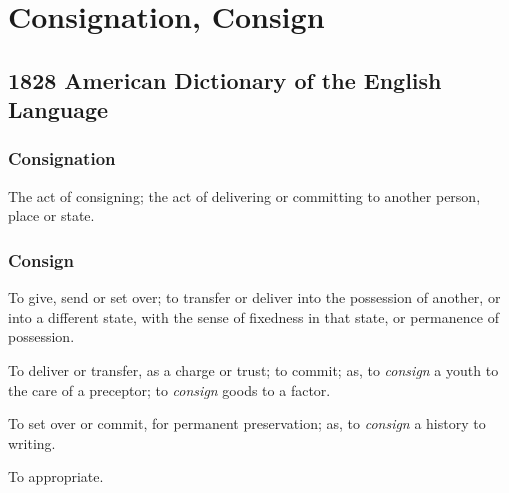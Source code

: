 \section{Consignation, Consign}
	\label{CONSIGNATION}
	

\subsection{1828 American Dictionary of the English Language} %
	\label{CONSIGNATION-1828}
	
	\subsubsection{Consignation}
	
		\begin{compactitem}
			\item The act of consigning; the act of delivering or committing to another person, place or state.
		\end{compactitem}
	
	\subsubsection{Consign}

		\begin{compactitem}
			\item[1] To give, send or set over; to transfer or deliver into the possession of another, or into a different state, with the sense of fixedness in that state, or permanence of possession.
			\item[2] To deliver or transfer, as a charge or trust; to commit; as, to \textit{consign} a youth to the care of a preceptor; to \textit{consign} goods to a factor.
			\item[3] To set over or commit, for permanent preservation; as, to \textit{consign} a history to writing.
			\item[4] To appropriate.
		\end{compactitem}

